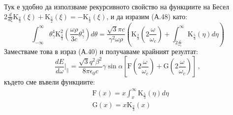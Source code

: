\begin{appendices}
\begin{equation}
\end{equation}
Тук е удобно да използваме рекурсивното свойство на функциите на Бесел $2\frac{d}{d\xi}\text{K}_{\frac{2}{3}}(\xi) + \text{K}_{\frac{5}{2}}(\xi) = - \text{K}_{\frac{1}{3}}(\xi)$, и да изразим (А.48) като:
\begin{equation}
		\int_{-\infty}^\infty \theta_\gamma^4 \text{K}^2_{\frac{2}{3}}\left(\frac{\omega\rho}{3 c}\theta_\gamma^3\right)d\theta = \frac{\sqrt{3}\pi c}{\gamma^2\omega\rho}\left(\text{K}_{\frac{2}{3}}\left(2\frac{\omega}{\omega_c}\right) + \int_{2\frac{\omega}{\omega_c}}^{\infty} \text{K}_{\frac{5}{3}}(\eta)d\eta\right)
\end{equation}
Заместваме това в израз (А.40) и получаваме крайният резултат:
\begin{equation}
	\boxed{\frac{dE}{d\omega}\bigg\vert_\parallel = \frac{\sqrt{3}q^2\beta^2}{8\pi\epsilon_0 c}\gamma\sin\alpha\left[\text{F}\left(2\frac{\omega}{\omega_c}\right) + \text{G}\left(2\frac{\omega}{\omega_c}\right)\right]}\,,
\end{equation}
където сме въвели функциите:
\begin{equation}
	\begin{split}
	&\text{F}(x) = x\int_x^{\infty}\text{K}_{\frac{5}{3}}(\eta)d\eta\\
	&\text{G}(x) = x\text{K}_{\frac{2}{3}}(x)
	\end{split}
\end{equation}

\end{appendices}

